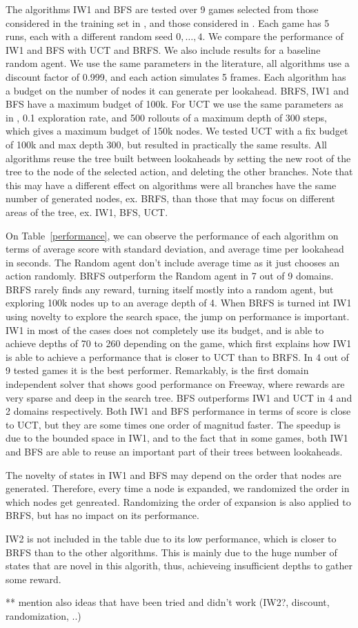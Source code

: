 The algorithms IW1 and BFS are tested over 9 games selected from those
considered in the training set in \cite{bellemare:jair}, and those
considered in \cite{deep-mind-atari}. Each game has 5 runs, each with
a different random seed $0,\ldots,4$.  We compare the performance of
IW1 and BFS with UCT and BRFS. We also include results for a baseline random
agent. We use the same parameters in the literature, all algorithms use a discount factor of 0.999, and each action
simulates 5 frames. Each algorithm has a budget on the number of nodes
it can generate per lookahead. BRFS, IW1 and BFS have a maximum budget
of 100k. For UCT we use the same parameters as in
\cite{bellemare:jair}, 0.1 exploration rate, and 500 rollouts of a maximum depth of 300 steps,
which gives a maximum budget of 150k nodes. We tested UCT with a fix
budget of 100k and max depth 300, but resulted in practically the same
results. All algorithms reuse the tree built between lookaheads by
setting the new root of the tree to the node of the selected action,
and deleting the other branches. Note that this may have a different
effect on algorithms were all branches have the same number of
generated nodes, ex. BRFS, than those that may focus on different
areas of the tree, ex. IW1, BFS, UCT.

On Table~\ref{performance}, we can observe the performance of each
algorithm on terms of average score with standard deviation, and
average time per lookahead in seconds. The Random agent don't include
average time as it just chooses an action randomly. BRFS outperform
the Random agent in 7 out of 9 domains. BRFS rarely finds any reward,
turning itself mostly into a random agent, but exploring 100k nodes up
to an average depth of 4. When BRFS is turned int IW1 using novelty to
explore the search space, the jump on performance is important. IW1 in
most of the cases does not completely use its budget, and is able to
achieve depths of 70 to 260 depending on the game, which first
explains how IW1 is able to achieve a performance that is closer to
UCT than to BRFS. In 4 out of 9 tested games it is the best
performer. Remarkably, is the first domain independent solver that
shows good performance on Freeway, where rewards are very sparse and
deep in the search tree. BFS outperforms IW1 and UCT in 4 and 2
domains respectively.  Both IW1 and BFS performance in terms of score
is close to UCT, but they are some times one order of magnitud
faster. The speedup is due to the bounded space in IW1, and to the
fact that in some games, both IW1 and BFS are able to reuse an
important part of their trees between lookaheads.

The novelty of states in IW1 and BFS may depend on the order that
nodes are generated. Therefore, every time a node is expanded, we
randomized the order in which nodes get genreated. Randomizing the
order of expansion is also applied to BRFS, but has no impact on its
performance.

IW2 is not included in the table due to its low performance, which is
closer to BRFS than to the other algorithms. This is mainly due to the
huge number of states that are novel in this algorith, thus,
achieveing insufficient depths to gather some reward.


 ** mention also ideas that have been tried and didn't work (IW2?,
 discount, randomization, ..)
